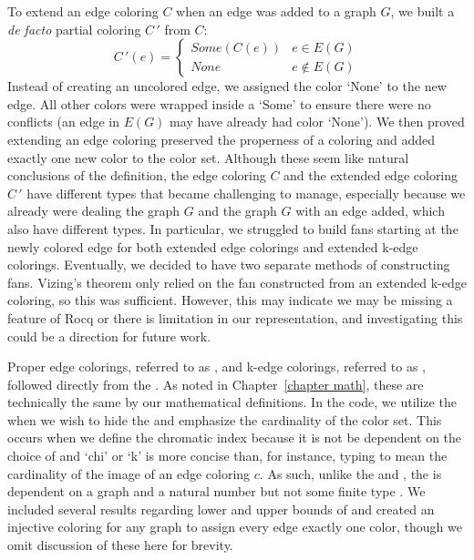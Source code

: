 To extend an edge coloring $C$ when an edge was added to a graph $G$, we built a \textit{de facto} partial coloring $C\,'$ from $C:$
$$C\,'(e) = \begin{cases}
Some (C(e)) & e \in E(G)\\
None & e \notin E(G)
\end{cases}$$
Instead of creating an uncolored edge, we assigned the color `None' to the new edge. All other colors were wrapped inside a `Some' to ensure there were no conflicts (an edge in $E(G)$ may have already had color `None'). We then proved extending an edge coloring preserved the properness of a coloring and added exactly one new color to the color set. Although these seem like natural conclusions of the definition, the edge coloring $C$ and the extended edge coloring $C\,'$ have different types that became challenging to manage, especially because we already were dealing the graph $G$ and the graph $G$ with an edge added, which also have different types. In particular, we struggled to build fans starting at the newly colored edge for both extended edge colorings and extended k-edge colorings. Eventually, we decided to have two separate methods of constructing fans. Vizing's theorem only relied on the fan constructed from an extended k-edge coloring, so this was sufficient. However, this may indicate we may be missing a feature of Rocq or there is limitation in our representation, and investigating this could be a direction for future work.

Proper edge colorings, referred to as , and k-edge colorings, referred to as , followed directly from the . As noted in Chapter~\ref{chapter math}, these are technically the same by our mathematical definitions. In the code, we utilize the  when we wish to hide the  and emphasize the cardinality of the color set. This occurs when we define the chromatic index because it is not be dependent on the choice of  and `chi’ or `k’ is more concise than, for instance, typing  to mean the cardinality of the image of an edge coloring $c.$ As such, unlike the  and , the  is dependent on a graph  and a natural number  but not some finite type . We included several results regarding lower and upper bounds of  and created an injective coloring for any graph to assign every edge exactly one color, though we omit discussion of these here for brevity. 

